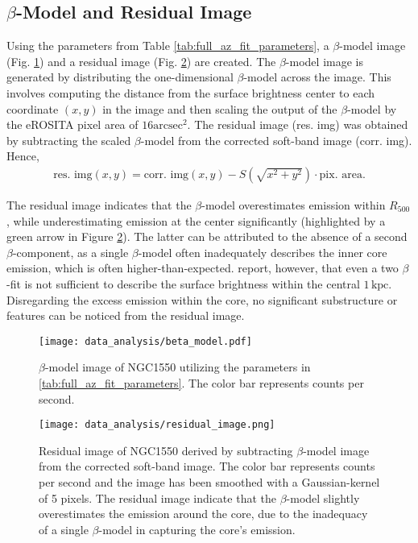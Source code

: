 \subsection{\(\beta\)-Model and Residual Image}
Using the parameters from Table \ref{tab:full_az_fit_parameters}, a \(\beta\)-model image (Fig. \ref{fig:beta_model}) and a residual image (Fig. \ref{fig:residual_image}) are created. The \(\beta\)-model image is generated by distributing the one-dimensional \(\beta\)-model across the image. This involves computing the distance from the surface brightness center to each coordinate \((x, y)\) in the image and then scaling the output of the \(\beta\)-model by the eROSITA pixel area of \(16\text{arcsec}^2\). The residual image (res. img) was obtained by subtracting the scaled \(\beta\)-model from the corrected soft-band image (corr. img). Hence,
\begin{align*}
    \text{res. img}(x, y) = \text{corr. img}(x, y) - S\left(\sqrt{x^2 + y^2}\right) \cdot \text{pix. area}.
\end{align*}

The residual image indicates that the \(\beta\)-model overestimates emission within \(R_{500}\), while underestimating emission at the center significantly (highlighted by a green arrow in Figure \ref{fig:residual_image}). The latter can be attributed to the absence of a second \(\beta\)-component, as a single \(\beta\)-model often inadequately describes the inner core emission, which is often higher-than-expected. \citep{Sun_2003} report, however, that even a two \(\beta\)-fit is not sufficient to describe the surface brightness within the central \(1\,\text{kpc}\). Disregarding the excess emission within the core, no significant substructure or features can be noticed from the residual image.
\begin{figure}[htbp]
    \centering
    \texttt{[image: data\_analysis/beta\_model.pdf]}
    \caption{\(\beta\)-model image of NGC1550 utilizing the parameters in \ref{tab:full_az_fit_parameters}. The color bar represents counts per second.}
    \label{fig:beta_model}
\end{figure}
\begin{figure}[htbp]
    \centering
    \texttt{[image: data\_analysis/residual\_image.png]}
    \caption{Residual image of NGC1550 derived by subtracting \(\beta\)-model image from the corrected soft-band image. The color bar represents counts per second and the image has been smoothed with a Gaussian-kernel of 5 pixels. The residual image indicate that the \(\beta\)-model slightly overestimates the emission around the core, due to the inadequacy of a single \(\beta\)-model in capturing the core's emission.}
    \label{fig:residual_image}
\end{figure}
